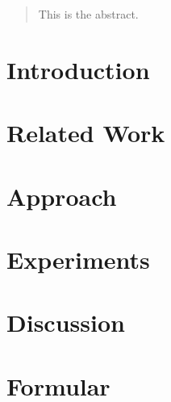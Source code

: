 \documentclass[]{report}
\title{}
\author{Jingyuan Sha}
\begin{document}
\maketitle

\begin{abstract}
	This is the abstract.
\end{abstract}



\newpage
\chapter{Introduction}



\newpage
\chapter{Related Work}


\newpage
\chapter{Approach}


\newpage
\chapter{Experiments}


\newpage
\chapter{Discussion}


\newpage
\chapter{Formular}



\medskip



\end{document}
